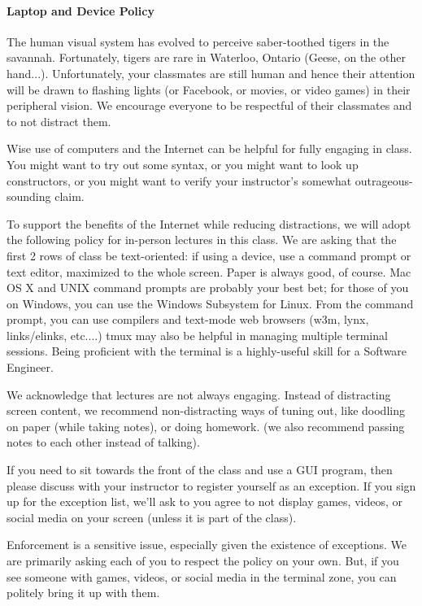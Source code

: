 \documentclass[letterpaper,10pt]{article}
\begin{document}
\paragraph{Laptop and Device Policy}
The human visual system has evolved to perceive saber-toothed tigers
in the savannah. Fortunately, tigers are rare in Waterloo, Ontario
(Geese, on the other hand...).
Unfortunately, your classmates are still human and hence their
attention will be drawn to flashing lights (or Facebook, or movies, or
video games) in their peripheral vision. We encourage
everyone to be respectful of their classmates and to not distract them.

Wise use of computers and the Internet can be helpful for fully
engaging in class. You might want to try out some syntax, or you might
want to look up constructors, or you might want to verify your
instructor's somewhat outrageous-sounding claim.

To support the benefits of the Internet while reducing distractions,
we will adopt the following policy for in-person lectures in this class. We are asking that the
first 2 rows of class be text-oriented: if using a device, use a
command prompt or text editor, maximized to the whole screen. Paper is
always good, of course. Mac OS X and UNIX command prompts are probably
your best bet; for those of you on Windows, you can use the Windows
Subsystem for Linux. From the command prompt, you can use compilers
and text-mode web browsers (w3m, lynx, links/elinks, etc....) tmux may
also be helpful in managing multiple terminal sessions. Being
proficient with the terminal is a highly-useful skill for a Software
Engineer.

We acknowledge that lectures are not always engaging. Instead of
distracting screen content, we recommend non-distracting ways of tuning
out, like doodling on paper (while taking notes), or doing homework.
(we also recommend passing notes to each other instead of talking).

If you need to sit towards the front of the class and use a GUI
program, then please discuss with your instructor to register
yourself as an exception. If you sign up for
the exception list, we'll ask to you agree to not display games,
videos, or social media on your screen (unless it is part of the
class).

Enforcement is a sensitive issue, especially given the existence of
exceptions. We are primarily asking each of you to respect the policy
on your own. But, if you see someone with games, videos, or social
media in the terminal zone, you can politely bring it up with them.
\end{document}
